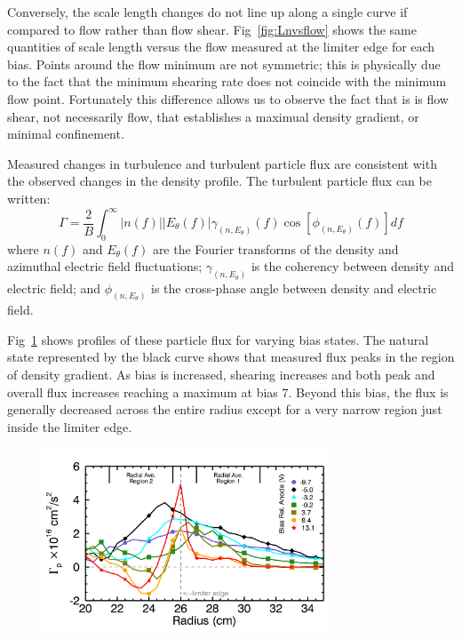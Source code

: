 \documentclass[aip,pop,amsmath,amssymb,preprint,superscriptaddress]{revtex4-1} %
\begin{document}
Conversely, the scale length changes do not line up along a single curve if compared to flow rather than flow shear. Fig~\ref{fig:Lnvsflow} shows the same quantities of scale length versus the flow measured at the limiter edge for each bias. Points around the flow minimum are not symmetric; this is physically due to the fact that the minimum shearing rate does not coincide with the minimum flow point. Fortunately this difference allows us to observe the fact that is is flow shear, not necessarily flow, that establishes a maximual density gradient, or minimal confinement.

Measured changes in turbulence and turbulent particle flux are
consistent with the observed changes in the density profile.  The
turbulent particle flux can be written\cite{powers74}:
\begin{equation}
\Gamma = \frac{2}{B} \int^{\infty}_{0} \lvert n(f) \rvert \lvert E_{\theta}(f) \rvert \gamma_{(n,E_{\theta})}(f) \cos [\phi_{(n,E_{\theta})}(f)] df
\label{eq:fluxint}
\end{equation}
where $n(f)$ and $E_\theta(f)$ are the Fourier transforms of
the density and azimuthal electric field fluctuations;
$\gamma_{(n,E_\theta)}$ is the coherency between density and electric
field; and $\phi_{(n,E_\theta)}$ is the cross-phase angle between
density and electric field.

Fig~\ref{fig:particlefluxprofiles} shows profiles of these particle flux for varying bias states. The natural state represented by the black curve shows that measured flux peaks in the region of density gradient. As bias is increased, shearing increases and both peak and overall flux increases reaching a maximum at bias 7. Beyond this bias, the flux is generally decreased across the entire radius except for a very narrow region just inside the limiter edge.

\begin{figure}[!htbp]
\centerline{
\includegraphics[width=8.5cm]{particlefluxprofiles.png}}
\caption{\label{fig:particlefluxprofiles}}
\end{figure}
\end{document}
